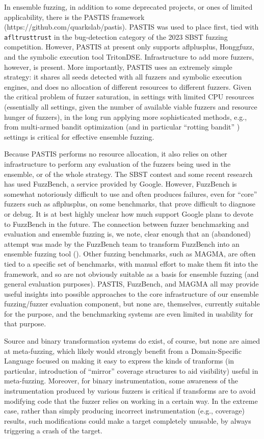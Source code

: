 \documentclass[numbers]{proposalnsf}
\begin{document}
In ensemble fuzzing, in addition to some deprecated projects, or ones of limited applicability, there is the PASTIS framework (https://github.com/quarkslab/pastis).  PASTIS was used to place first, tied with {\tt afltrusttrust} in the bug-detection category of the 2023 SBST fuzzing competition.  However, PASTIS at present only supports aflplusplus, Honggfuzz, and the symbolic execution tool TritonDSE.  Infrastructure to add more fuzzers, however, is present.  More importantly, PASTIS uses an extremely simple strategy:  it shares all seeds detected with all fuzzers and symbolic execution engines, and does no allocation of different resources to different fuzzers.  Given the critical problem of fuzzer saturation, in settings with limited CPU resources (essentially all settings, given the number of available viable fuzzers and resource hunger of fuzzers), in the long run applying more sophisticated methods, e.g., from multi-armed bandit optimization (and in particular ``rotting bandit'' \cite{}) settings is critical for effective ensemble fuzzing.

Because PASTIS performs no resource allocation, it also relies on other infrastructure to perform any evaluation of the fuzzers being used in the ensemble, or of the whole strategy.  The SBST contest and some recent research has used FuzzBench, a service provided by Google.  However, FuzzBench is somewhat notoriously difficult to use and often produces failures, even for ``core'' fuzzers such as aflplusplus, on some benchmarks, that prove difficult to diagnose or debug.  It is at best highly unclear how much support Google plans to devote to FuzzBench in the future.  The connection between fuzzer benchmarking and evaluation and ensemble fuzzing is, we note, clear enough that an (abandoned) attempt was made by the FuzzBench team to transform FuzzBench into an ensemble fuzzing tool (\url{}).   Other fuzzing benchmarks, such as MAGMA, are often tied to a specific set of benchmarks, with manual effort to make them fit into the framework, and so are not obviously suitable as a basis for ensemble fuzzing (and general evaluation purposes).  PASTIS, FuzzBench, and MAGMA all may provide useful insights into possible approaches to the core infrastructure of our ensemble fuzzing/fuzzer evaluation component, but none are, themselves, currently suitable for the purpose, and the benchmarking systems are even limited in usability for that purpose.

Source and binary transformation systems do exist, of course, but none are aimed at meta-fuzzing, which likely would strongly benefit from a Domain-Specific Language focused on making it easy to express the kinds of tranforms (in particular, introduction of ``mirror'' coverage structures to aid visibility) useful in meta-fuzzing.  Moreover, for binary instrumentation, some awareness of the instrumentation produced by various fuzzers is critical if transforms are to avoid modifying code that the fuzzer relies on working in a certain way.  In the extreme case, rather than simply producing incorrect instrumentation (e.g., coverage) results, such modifications could make a target completely unusable, by always triggering a crash of the target.
\end{document}
